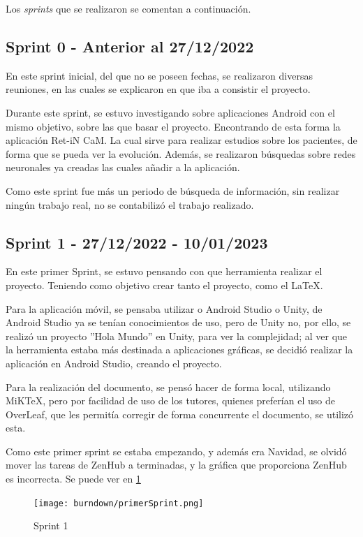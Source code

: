 Los \textit{sprints} que se realizaron se comentan a continuación.

\subsection{Sprint 0 - Anterior al 27/12/2022}
En este sprint inicial, del que no se poseen fechas, se realizaron diversas reuniones, en las cuales se explicaron en que iba a consistir el proyecto.

Durante este sprint, se estuvo investigando sobre aplicaciones Android con el mismo objetivo, sobre las que basar el proyecto. Encontrando de esta forma la aplicación Ret-iN CaM. La cual sirve para realizar estudios sobre los pacientes, de forma que se pueda ver la evolución.
Además, se realizaron búsquedas sobre redes neuronales ya creadas las cuales añadir a la aplicación. 

Como este sprint fue más un periodo de búsqueda de información, sin realizar ningún trabajo real, no se contabilizó el trabajo realizado.
\subsection{Sprint 1 - 27/12/2022 - 10/01/2023}
En este primer Sprint, se estuvo pensando con que herramienta realizar el proyecto. Teniendo como objetivo crear tanto el proyecto, como el LaTeX.

Para la aplicación móvil, se pensaba utilizar o Android Studio o Unity, de Android Studio ya se tenían conocimientos de uso, pero de Unity no, por ello, se realizó un proyecto ''Hola Mundo'' en Unity, para ver la complejidad; al ver que la herramienta estaba más destinada a aplicaciones gráficas, se decidió realizar la aplicación en Android Studio, creando el proyecto.

Para la realización del documento, se pensó hacer de forma local, utilizando MiKTeX, pero por facilidad de uso de los tutores, quienes preferían el uso de OverLeaf, que les permitía corregir de forma concurrente el documento, se utilizó esta.

Como este primer sprint se estaba empezando, y además era Navidad, se olvidó mover las tareas de ZenHub a terminadas, y la gráfica que proporciona ZenHub es incorrecta. Se puede ver en \ref{fig:Sprint1}

\begin{figure}[!ht]
         \centering
         \texttt{[image: burndown/primerSprint.png]}
         \caption{Sprint 1}
         \label{fig:Sprint1}
\end{figure}

